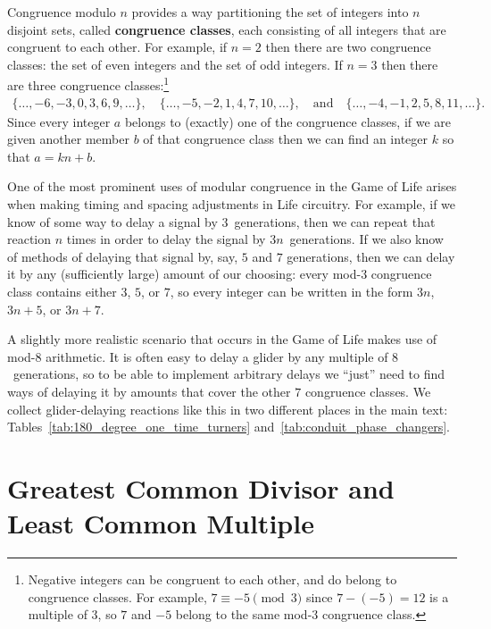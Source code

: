 \clearpage


Congruence modulo $n$ provides a way partitioning the set of integers into $n$ disjoint sets, called \textbf{congruence classes}, each consisting of all integers that are congruent to each other. For example, if $n = 2$ then there are two congruence classes: the set of even integers and the set of odd integers. If $n = 3$ then there are three congruence classes:\footnote{Negative integers can be congruent to each other, and do belong to congruence classes. For example, $7 \equiv -5 \pmod{3}$ since $7-(-5) = 12$ is a multiple of $3$, so $7$ and $-5$ belong to the same mod-$3$ congruence class.}
\begin{align*}
	\{\ldots, -6, -3, 0, 3, 6, 9, \ldots\}, \quad \{\ldots, -5, -2, 1, 4, 7, 10, \ldots\}, \quad \text{and} \quad \{\ldots, -4, -1, 2, 5, 8, 11, \ldots\}.
\end{align*}
Since every integer $a$ belongs to (exactly) one of the congruence classes, if we are given another member $b$ of that congruence class then we can find an integer $k$ so that $a = kn + b$.

One of the most prominent uses of modular congruence in the Game of Life arises when making timing and spacing adjustments in Life circuitry. For example, if we know of some way to delay a signal by $3$~generations, then we can repeat that reaction $n$ times in order to delay the signal by $3n$~generations. If we also know of methods of delaying that signal by, say, $5$ and $7$ generations, then we can delay it by any (sufficiently large) amount of our choosing: every mod-$3$ congruence class contains either $3$, $5$, or $7$, so every integer can be written in the form $3n$, $3n + 5$, or $3n + 7$.

A slightly more realistic scenario that occurs in the Game of Life makes use of mod-$8$ arithmetic. It is often easy to delay a glider by any multiple of $8$~generations, so to be able to implement arbitrary delays we ``just'' need to find ways of delaying it by amounts that cover the other $7$ congruence classes. We collect glider-delaying reactions like this in two different places in the main text: Tables~\ref{tab:180_degree_one_time_turners} and~\ref{tab:conduit_phase_changers}.


\section{Greatest Common Divisor and Least Common Multiple}\label{sec:gcd}

